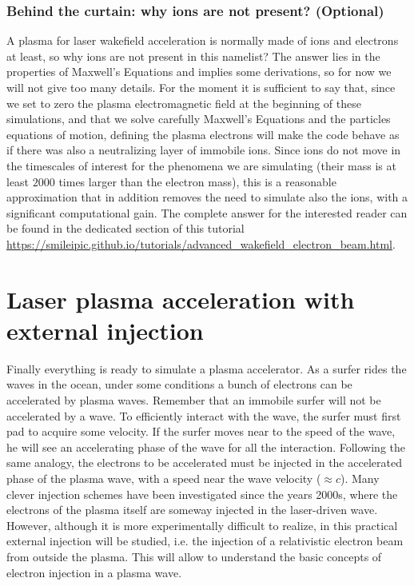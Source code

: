 \documentclass{article}
\begin{document}
\subsubsection*{Behind the curtain: why ions are not present? (Optional)} A plasma for laser wakefield acceleration is normally made of ions and electrons at least, so why ions are not present in this namelist? The answer lies in the properties of Maxwell's Equations and implies some derivations, so for now we will not give too many details. For the moment it is sufficient to say that, since we set to zero the plasma electromagnetic field at the beginning of these simulations, and that we solve carefully Maxwell's Equations and the particles equations of motion, defining the plasma electrons will make the code behave as if there was also a neutralizing layer of immobile ions. Since ions do not move in the timescales of interest for the phenomena we are simulating (their mass is at  least $2000$ times larger than the electron mass), this is a reasonable approximation that in addition removes the need to simulate also the ions, with a significant computational gain. The complete answer for the interested reader can be found in the dedicated section of this tutorial \url{https://smileipic.github.io/tutorials/advanced_wakefield_electron_beam.html}.

\section{Laser plasma acceleration with external injection}
Finally everything is ready to simulate a plasma accelerator. As a surfer rides the waves in the ocean,  under some conditions a bunch of electrons can be accelerated by plasma waves. Remember that an immobile surfer will not be accelerated by a wave. To efficiently interact with the wave, the surfer must first pad to acquire some velocity. If the surfer moves near to the speed of the wave, he will see an accelerating phase of the wave for all the interaction.
Following the same analogy,  the electrons to be accelerated must be injected in the accelerated phase of the plasma wave, with a speed near the wave velocity  ($\approx c$). Many clever injection schemes have been investigated since  the years 2000s, where the electrons of the plasma itself are someway injected in the laser-driven wave. However, although it is more experimentally difficult to realize, in this practical external injection will be studied, i.e. the injection of a relativistic electron beam from outside the plasma. This will allow to understand the basic concepts of electron injection in a plasma wave. \\
\end{document}
